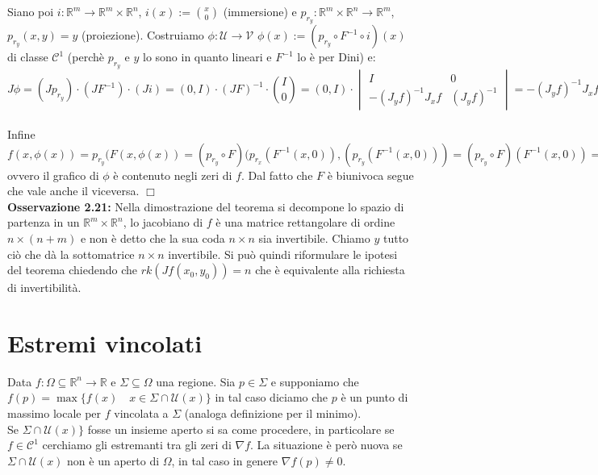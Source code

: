 \documentclass[a4paper,11pt,titlepage]{book}
\begin{document}
Siano poi $i:\mathbb{R}^m\to\mathbb{R}^m\times\mathbb{R}^n$, $i(x):=\binom{x}{0}$ (immersione) e $p_{r_y}:\mathbb{R}^m\times\mathbb{R}^n\to\mathbb{R}^m$, $p_{r_y}(x,y)=y$ (proiezione). Costruiamo $\phi:\mathcal{U}\to\mathcal{V}$ $\phi(x):=(p_{r_y}\circ F^{-1}\circ i)(x)$ di classe $\mathcal{C}^1$ (perchè $p_{r_y}$ e $y$ lo sono in quanto lineari e $F^{-1}$ lo è per Dini) e:$$J\phi=(Jp_{r_y})\cdot(JF^{-1})\cdot(Ji)=(0,I)\cdot(JF)^{-1}\cdot\binom{I}{0}=
(0,I)\cdot\begin{vmatrix} I & 0 \\ -(J_yf)^{-1}J_xf & (J_yf)^{-1} \end{vmatrix}=-(J_yf)^{-1}J_xf$$\\

Infine $f(x,\phi(x))=p_{r_y}(F(x,\phi(x))=(p_{r_y}\circ F)(p_{r_x}(F^{-1}(x,0)),(p_{r_y}(F^{-1}(x,0)))=(p_{r_y}\circ F)(F^{-1}(x,0))=(p_{r_y}\circ F\circ F^{-1})(x,0)=p_{r_y}(x,0)=0$
 ovvero il grafico di $\phi$ è contenuto negli zeri di $f$. Dal fatto che $F$ è biunivoca segue che vale anche il viceversa. $\Box$\\
 
\textbf{Osservazione 2.21:} Nella dimostrazione del teorema si decompone lo spazio di partenza in un $\mathbb{R}^m\times\mathbb{R}^n$, lo jacobiano di $f$ è una matrice rettangolare di ordine $n\times(n+m)$ e non è detto che la sua coda $n\times n$ sia invertibile. Chiamo $y$ tutto ciò che dà la sottomatrice $n\times n$ invertibile. Si può quindi riformulare le ipotesi del teorema chiedendo che $rk(Jf(x_0,y_0))=n$ che è equivalente alla richiesta di invertibilità.\\

\section{Estremi vincolati}

Data $f:\Omega\subseteq\mathbb{R}^n\to\mathbb{R}$ e $\Sigma\subseteq\Omega$ una regione. Sia $p\in\Sigma$ e supponiamo che $f(p)=\max\{f(x)\quad x\in\Sigma\cap\mathcal{U}(x)\}$ in tal caso diciamo che $p$ è un punto di massimo locale per $f$ vincolata a $\Sigma$ (analoga definizione per il minimo).\\

Se $\Sigma\cap\mathcal{U}(x)\}$ fosse un insieme aperto si sa come procedere, in particolare se $f\in\mathcal{C}^1$ cerchiamo gli estremanti tra gli zeri di $\nabla f$. La situazione è però nuova se 
$\Sigma\cap\mathcal{U}(x)$ non è un aperto di $\Omega$, in tal caso in genere $\nabla f(p)\ne 0$.\\
\end{document}
